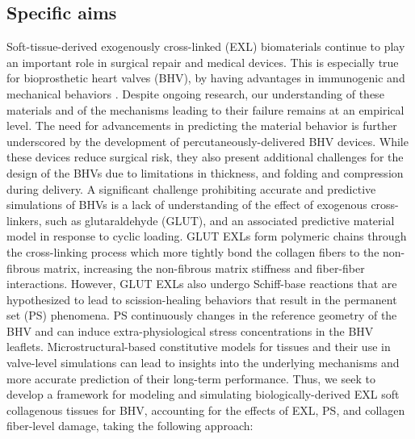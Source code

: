 \subsection{Specific aims}
    Soft-tissue-derived exogenously cross-linked (EXL) biomaterials continue to play an important role in surgical repair and medical devices. This is especially true for bioprosthetic heart valves (BHV), by having advantages in immunogenic and mechanical behaviors \cite{starr_artificial_2007}. Despite ongoing research, our understanding of these materials and of the mechanisms leading to their failure remains at an empirical level. The need for advancements in predicting the material behavior is further underscored by the development of percutaneously-delivered BHV devices. While these devices reduce surgical risk, they also present additional challenges for the design of the BHVs due to limitations in thickness, and folding and compression during delivery. A significant challenge prohibiting accurate and predictive simulations of BHVs is a lack of understanding of the effect of exogenous cross-linkers, such as glutaraldehyde (GLUT), and an associated predictive material model in response to cyclic loading. GLUT EXLs form polymeric chains through the cross-linking process which more tightly bond the collagen fibers to the non-fibrous matrix, increasing the non-fibrous matrix stiffness and fiber-fiber interactions. However, GLUT EXLs also undergo Schiff-base reactions that are hypothesized to lead to scission-healing behaviors that result in the permanent set (PS) phenomena. PS continuously changes in the reference geometry of the BHV and can induce extra-physiological stress concentrations in the BHV leaflets. Microstructural-based constitutive models for tissues and their use in valve-level simulations can lead to insights into the underlying mechanisms and more accurate prediction of their long-term performance. Thus, we seek to develop a framework for modeling and simulating biologically-derived EXL soft collagenous tissues for BHV, accounting for the effects of EXL, PS, and collagen fiber-level damage, taking the following approach:


